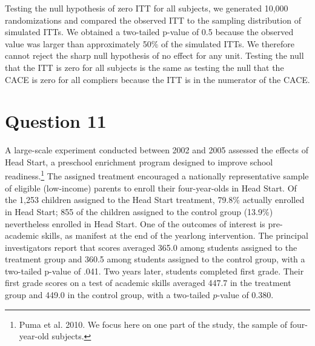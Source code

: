 \documentclass[11pt,notitlepage]{article}\usepackage[]{graphicx}\usepackage[]{color}
\begin{document}
Testing the null hypothesis of zero ITT for all subjects, we generated 10,000 randomizations and compared the observed ITT to the sampling distribution of simulated ITTs. We obtained a two-tailed p-value of 0.5 because the observed value was larger than approximately 50\% of the simulated ITTs. We therefore cannot reject the sharp null hypothesis of no effect for any unit. Testing the null that the ITT is zero for all subjects is the same as testing the null that the CACE is zero for all compliers because the ITT is in the numerator of the CACE. 

\section*{Question 11}
A large-scale experiment conducted between 2002 and 2005 assessed the effects of Head Start, a preschool enrichment program designed to improve school readiness.\footnote{Puma et al. 2010. We focus here on one part of the study, the sample of four-year-old subjects.} The assigned treatment encouraged a nationally representative sample of eligible (low-income) parents to enroll their four-year-olds in Head Start. Of the 1,253 children assigned to the Head Start treatment, 79.8\% actually enrolled in Head Start; 855 of the children assigned to the control group (13.9\%) nevertheless enrolled in Head Start. One of the outcomes of interest is pre-academic skills, as manifest at the end of the yearlong intervention. The principal investigators report that scores averaged 365.0 among students assigned to the treatment group and 360.5 among students assigned to the control group, with a two-tailed p-value of .041. Two years later, students completed first grade. Their first grade scores on a test of academic skills averaged 447.7 in the treatment group and 449.0 in the control group, with a two-tailed $p$-value of 0.380.
\end{document}

